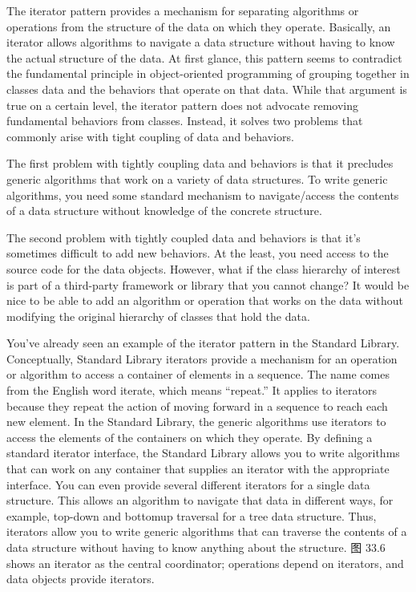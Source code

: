 The iterator pattern provides a mechanism for separating algorithms or operations from the structure of the data on which they operate. Basically, an iterator allows algorithms to navigate a data structure without having to know the actual structure of the data. At first glance, this pattern seems to contradict the fundamental principle in object-oriented programming of grouping together in classes data and the behaviors that operate on that data. While that argument is true on a certain level, the iterator pattern does not advocate removing fundamental behaviors from classes. Instead, it solves two problems that commonly arise with tight coupling of data and behaviors.

The first problem with tightly coupling data and behaviors is that it precludes generic algorithms that work on a variety of data structures. To write generic algorithms, you need some standard mechanism to navigate/access the contents of a data structure without knowledge of the concrete structure.

The second problem with tightly coupled data and behaviors is that it’s sometimes difficult to add new behaviors. At the least, you need access to the source code for the data objects. However, what if the class hierarchy of interest is part of a third-party framework or library that you cannot change? It would be nice to be able to add an algorithm or operation that works on the data without modifying the original hierarchy of classes that hold the data.

You’ve already seen an example of the iterator pattern in the Standard Library. Conceptually, Standard Library iterators provide a mechanism for an operation or algorithm to access a container of elements in a sequence. The name comes from the English word iterate, which means “repeat.” It applies to iterators because they repeat the action of moving forward in a sequence to reach each new element. In the Standard Library, the generic algorithms use iterators to access the elements of the containers on which they operate. By defining a standard iterator interface, the Standard Library allows you to write algorithms that can work on any container that supplies an iterator with the appropriate interface. You can even provide several different iterators for a single data structure. This allows an algorithm to navigate that data in different ways, for example, top-down and bottomup traversal for a tree data structure. Thus, iterators allow you to write generic algorithms that can traverse the contents of a data structure without having to know anything about the structure. 图 33.6 shows an iterator as the central coordinator; operations depend on iterators, and data objects provide iterators.

